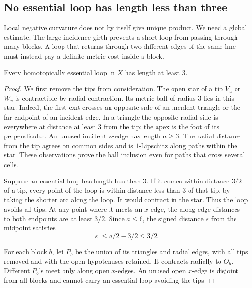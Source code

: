 \subsection{No essential loop has length less than three}

Local negative curvature does not by itself give unique product.
We need a global estimate. The large incidence girth prevents a short
loop from passing through many blocks. A loop that returns through
two different edges of the same line must instead pay a definite
metric cost inside a block.

\begin{proposition}\label{prop:systole}
Every homotopically essential loop in \(X\) has length at least \(3\).
\end{proposition}

\begin{proof}
We first remove the tips from consideration. The open star of a tip
\(V_u\) or \(W_v\) is contractible by radial contraction. Its metric
ball of radius \(3\) lies in this star. Indeed, the first exit crosses
an opposite side of an incident triangle or the far endpoint of an
incident edge. In a triangle the opposite radial side is everywhere
at distance at least \(3\) from the tip: the apex is the foot of its
perpendicular. An unused incident \(x\)-edge has length \(a\ge3\).
The radial distance from the tip agrees on common sides and is
\(1\)-Lipschitz along paths within the star. These observations prove
the ball inclusion even for paths that cross several cells.

Suppose an essential loop has length less than \(3\). If it comes
within distance \(3/2\) of a tip, every point of the loop is within
distance less than \(3\) of that tip, by taking the shorter arc along
the loop. It would contract in the star. Thus the loop avoids all
tips. At any point where it meets an \(x\)-edge, the along-edge
distances to both endpoints are at least \(3/2\). Since \(a\le6\),
the signed distance \(s\) from the midpoint satisfies
\begin{equation}\label{eq:midpoint-window}
 |s|\le a/2-3/2\le3/2.
\end{equation}

For each block \(b\), let \(P_b\) be the union of its triangles and
radial edges, with all tips removed and with the open hypotenuses
retained. It contracts radially to \(O_b\). Different \(P_b\)'s meet
only along open \(x\)-edges. An unused open \(x\)-edge is disjoint
from all blocks and cannot carry an essential loop avoiding the tips.


\end{proof}
